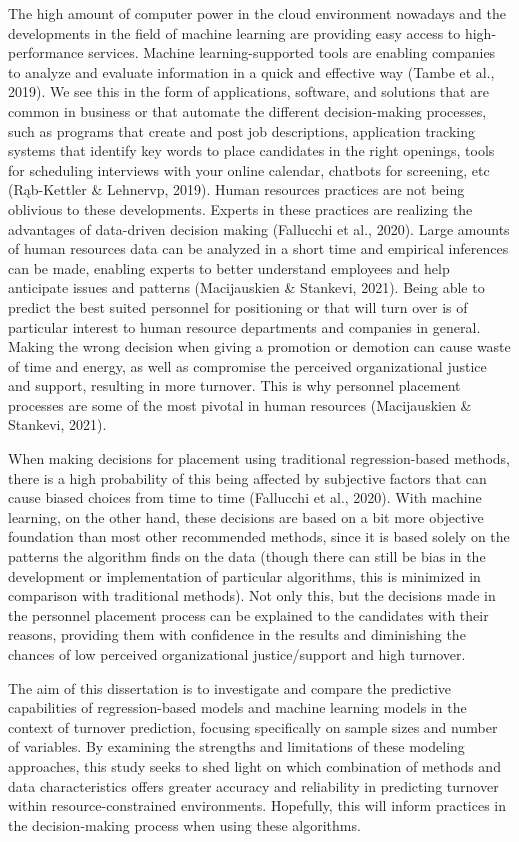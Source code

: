 \documentclass[
  man]{apa7}
\begin{document}
The high amount of computer power in the cloud environment nowadays and the developments in the field of machine learning are providing easy access to high-performance services.
Machine learning-supported tools are enabling companies to analyze and evaluate information in a quick and effective way (Tambe et al., 2019).
We see this in the form of applications, software, and solutions that are common in business or that automate the different decision-making processes, such as programs that create and post job descriptions, application tracking systems that identify key words to place candidates in the right openings, tools for scheduling interviews with your online calendar, chatbots for screening, etc (Rąb-Kettler \& Lehnervp, 2019).
Human resources practices are not being oblivious to these developments.
Experts in these practices are realizing the advantages of data-driven decision making (Fallucchi et al., 2020).
Large amounts of human resources data can be analyzed in a short time and empirical inferences can be made, enabling experts to better understand employees and help anticipate issues and patterns (Macijauskien \& Stankevi, 2021).
Being able to predict the best suited personnel for positioning or that will turn over is of particular interest to human resource departments and companies in general.
Making the wrong decision when giving a promotion or demotion can cause waste of time and energy, as well as compromise the perceived organizational justice and support, resulting in more turnover.
This is why personnel placement processes are some of the most pivotal in human resources (Macijauskien \& Stankevi, 2021).

When making decisions for placement using traditional regression-based methods, there is a high probability of this being affected by subjective factors that can cause biased choices from time to time (Fallucchi et al., 2020).
With machine learning, on the other hand, these decisions are based on a bit more objective foundation than most other recommended methods, since it is based solely on the patterns the algorithm finds on the data (though there can still be bias in the development or implementation of particular algorithms, this is minimized in comparison with traditional methods).
Not only this, but the decisions made in the personnel placement process can be explained to the candidates with their reasons, providing them with confidence in the results and diminishing the chances of low perceived organizational justice/support and high turnover.

The aim of this dissertation is to investigate and compare the predictive capabilities of regression-based models and machine learning models in the context of turnover prediction, focusing specifically on sample sizes and number of variables.
By examining the strengths and limitations of these modeling approaches, this study seeks to shed light on which combination of methods and data characteristics offers greater accuracy and reliability in predicting turnover within resource-constrained environments. Hopefully, this will inform practices in the decision-making process when using these algorithms.
\end{document}
